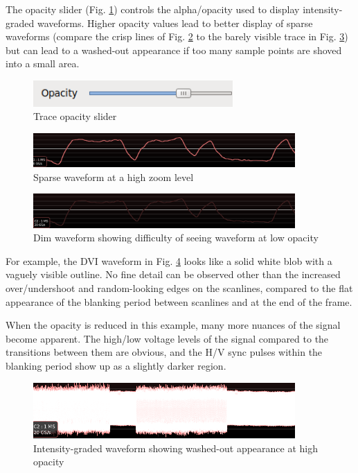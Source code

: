 \documentclass[11pt]{article}
\begin{document}
The opacity slider (Fig. \ref{opacityslider}) controls the alpha/opacity used to display intensity-graded waveforms.
Higher opacity values lead to better display of sparse waveforms (compare the crisp lines of Fig. \ref{sparse-waveform}
to the barely visible trace in Fig. \ref{dim-waveform}) but can lead to a washed-out appearance if too many sample
points are shoved into a small area.

\begin{figure}[H]
\centering
\includegraphics[height=1cm]{images/opacity-slider.png}
\caption{Trace opacity slider}
\label{opacityslider}
\end{figure}

\begin{figure}[H]
\centering
\includegraphics[width=10cm]{images/sparse-waveform.png}
\caption{Sparse waveform at a high zoom level}
\label{sparse-waveform}
\end{figure}

\begin{figure}[H]
\centering
\includegraphics[width=10cm]{images/dim-waveform.png}
\caption{Dim waveform showing difficulty of seeing waveform at low opacity}
\label{dim-waveform}
\end{figure}

For example, the DVI waveform in Fig. \ref{washedout-waveform} looks like a solid white blob with a vaguely visible
outline. No fine detail can be observed other than the increased over/undershoot and random-looking edges on the
scanlines, compared to the flat appearance of the blanking period between scanlines and at the end of the frame.

When the opacity is reduced in this example, many more nuances of the signal become apparent. The high/low voltage
levels of the signal compared to the transitions between them are obvious, and the H/V sync pulses within the blanking
period show up as a slightly darker region.

\begin{figure}[H]
\centering
\includegraphics[width=10cm]{images/washedout-waveform.png}
\caption{Intensity-graded waveform showing washed-out appearance at high opacity}
\label{washedout-waveform}
\end{figure}
\end{document}
